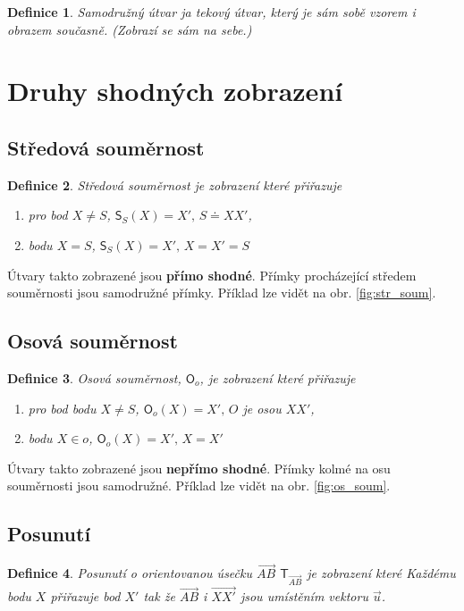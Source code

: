 \documentclass[12pt,a4wide,oneside,
headings]{report}
\newtheorem{defi}{Definice}[chapter]\theoremstyle{definition}
\begin{document}
\begin{defi}
Samodružný útvar ja tekový útvar, který je sám sobě vzorem i obrazem současně. (Zobrazí se sám na sebe.)
\end{defi}

\section{Druhy shodných zobrazení}
\subsection{Středová souměrnost}

\begin{defi}
Středová souměrnost je zobrazení které přiřazuje
\begin{enumerate}
\item pro bod $X\neq S$, $\mathsf{S}_S(X)=X',\,S\doteq XX'$,
\item bodu $X=S$, $\mathsf{S}_S(X)=X',\,X=X'=S$ 
\end{enumerate}
\end{defi}

Útvary takto zobrazené jsou \textbf{přímo shodné}. Přímky procházející středem souměrnosti jsou samodružné přímky. Příklad lze vidět na obr. \ref{fig:str_soum}.


\subsection{Osová souměrnost}

\begin{defi}
Osová souměrnost, $\mathsf{O}_o$, je zobrazení které přiřazuje
\begin{enumerate}
\item pro bod bodu $X\neq S$, $\mathsf{O}_o(X)=X',\,O$ je osou $XX'$,
\item bodu $X\in o$, $\mathsf{O}_o(X)=X',\,X=X'$ 
\end{enumerate}
\end{defi}

Útvary takto zobrazené jsou \textbf{nepřímo shodné}. Přímky kolmé na osu souměrnosti jsou samodružné. Příklad lze vidět na obr. \ref{fig:os_soum}.

\subsection{Posunutí}

\begin{defi}
Posunutí o orientovanou úsečku $\overrightarrow{AB}$ $\mathsf{T}_{\overrightarrow{AB}}$ je zobrazení které Každému bodu $X$ přiřazuje bod $X'$ tak že $\overrightarrow{AB}$ i $\overrightarrow{XX'}$ jsou umístěním vektoru $\vec{u}$.
\end{defi}
\end{document}
